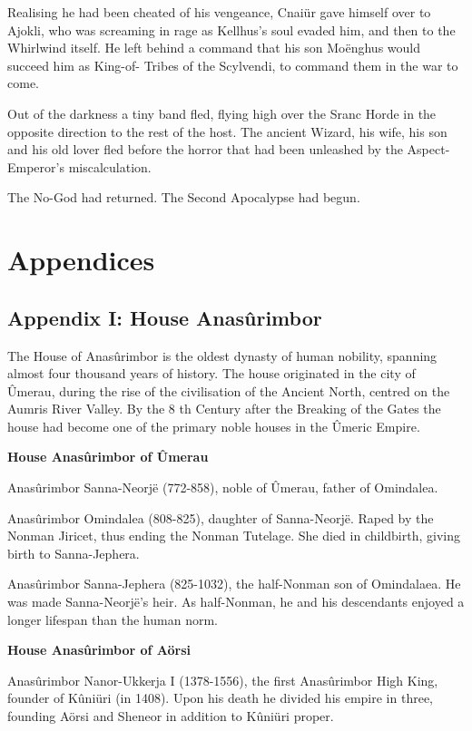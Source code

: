 \documentclass[]{book}
\begin{document}
Realising he had been cheated of his vengeance, Cnaiür gave himself over to Ajokli,
who was screaming in rage as Kellhus's soul evaded him, and then to the Whirlwind
itself. He left behind a command that his son Moënghus would succeed him as King-of-
Tribes of the Scylvendi, to command them in the war to come.

Out of the darkness a tiny band fled, flying high over the Sranc Horde in the opposite
direction to the rest of the host. The ancient Wizard, his wife, his son and his old lover
fled before the horror that had been unleashed by the Aspect-Emperor's miscalculation.

The No-God had returned. The Second Apocalypse had begun.

\hypertarget{appendices}{%
\chapter{Appendices}\label{appendices}}

\hypertarget{appendix-i-house-anasuxfbrimbor}{%
\section{Appendix I: House Anasûrimbor}\label{appendix-i-house-anasuxfbrimbor}}

The House of Anasûrimbor is the oldest dynasty of human nobility, spanning almost
four thousand years of history. The house originated in the city of Ûmerau, during the
rise of the civilisation of the Ancient North, centred on the Aumris River Valley. By the
8 th Century after the Breaking of the Gates the house had become one of the primary
noble houses in the Ûmeric Empire.

\textbf{House Anasûrimbor of Ûmerau}

Anasûrimbor Sanna-Neorjë (772-858), noble of Ûmerau, father of Omindalea.

Anasûrimbor Omindalea (808-825), daughter of Sanna-Neorjë. Raped by the
Nonman Jiricet, thus ending the Nonman Tutelage. She died in childbirth,
giving birth to Sanna-Jephera.

Anasûrimbor Sanna-Jephera (825-1032), the half-Nonman son of Omindalaea. He
was made Sanna-Neorjë's heir. As half-Nonman, he and his descendants
enjoyed a longer lifespan than the human norm.

\textbf{House Anasûrimbor of Aörsi}

Anasûrimbor Nanor-Ukkerja I (1378-1556), the first Anasûrimbor High King,
founder of Kûniüri (in 1408). Upon his death he divided his empire in three,
founding Aörsi and Sheneor in addition to Kûniüri proper.
\end{document}

